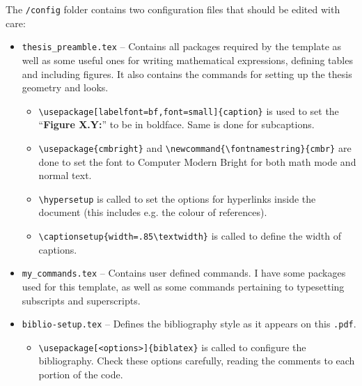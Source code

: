 The \texttt{/config} folder contains two configuration files that should be edited with care:
%
\begin{itemize}
\item \texttt{thesis\_preamble.tex} -- Contains all packages required by the template as well as some useful ones for writing mathematical expressions, defining tables and including figures. It also contains the commands for setting up the thesis geometry and looks.

\begin{itemize}
	\item \Verb*|\usepackage[labelfont=bf,font=small]{caption}| is used to set the ``\textbf{Figure X.Y:}'' to be in boldface. Same is done for subcaptions.
	\item \Verb*|\usepackage{cmbright}| and \Verb*|\newcommand{\fontnamestring}{cmbr}| are done to set the font to Computer Modern Bright for both math mode and normal text.
	\item \Verb*|\hypersetup| is called to set the options for hyperlinks inside the document (this includes e.g. the colour of references).
	\item \Verb*|\captionsetup{width=.85\textwidth}| is called to define the width of captions.
\end{itemize}


\item \texttt{my\_commands.tex} -- Contains user defined commands. I have some packages used for this template, as well as some commands pertaining to typesetting subscripts and superscripts.

\item \texttt{biblio-setup.tex} -- Defines the bibliography style as it appears on this \texttt{.pdf}.
\begin{itemize}
	\item \Verb*|\usepackage[<options>]{biblatex}| is called to configure the bibliography. Check these options carefully, reading the comments to each portion of the code.
\end{itemize}

\end{itemize}

